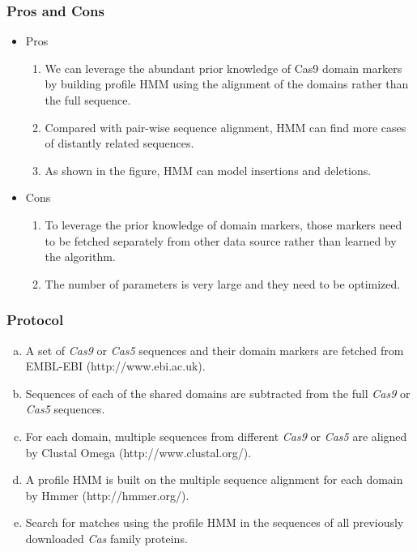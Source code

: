 \documentclass[11pt, oneside]{article}
\begin{document}
\subsubsection{Pros and Cons}
\begin{itemize}
\item Pros
\begin{enumerate}
\item We can leverage the abundant prior knowledge of Cas9 domain markers by building profile HMM using the alignment of the domains rather than the full sequence.
\item Compared with pair-wise sequence alignment, HMM can find more cases of distantly related sequences.
\item As shown in the figure, HMM can model insertions and deletions.
\end{enumerate}
\item Cons
\begin{enumerate}
\item To leverage the prior knowledge of domain markers, those markers need to be fetched separately from other data source rather than learned by the algorithm.
\item The number of parameters is very large and they need to be optimized.
\end{enumerate}
\end{itemize}


\subsubsection{Protocol}
\begin{enumerate}[a.]
\item A set of \textit{Cas9} or \textit{Cas5} sequences and their domain markers are fetched from EMBL-EBI (http://www.ebi.ac.uk).
\item Sequences of each of the shared domains are subtracted from the full \textit{Cas9} or \textit{Cas5} sequences.
\item For each domain, multiple sequences from different \textit{Cas9} or \textit{Cas5} are aligned by Clustal Omega (http://www.clustal.org/).
\item  A profile HMM is built on the multiple sequence alignment for each domain by Hmmer (http://hmmer.org/)\cite{hmmer}.
\item Search for matches using the profile HMM in the sequences of all previously downloaded \textit{Cas} family proteins.
\end{enumerate}
\end{document}
